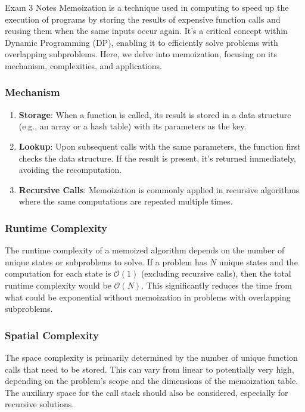 \begin{examnotes}{Exam 3 Notes}
    Memoization is a technique used in computing to speed up the execution of programs by storing the results of expensive function calls and reusing them when the same inputs occur again. It's a 
    critical concept within Dynamic Programming (DP), enabling it to efficiently solve problems with overlapping subproblems. Here, we delve into memoization, focusing on its mechanism, complexities, 
    and applications.

    \subsubsection*{Mechanism}

    \begin{enumerate}
        \item \textbf{Storage}: When a function is called, its result is stored in a data structure (e.g., an array or a hash table) with its parameters as the key.
        \item \textbf{Lookup}: Upon subsequent calls with the same parameters, the function first checks the data structure. If the result is present, it's returned immediately, avoiding the recomputation.
        \item \textbf{Recursive Calls}: Memoization is commonly applied in recursive algorithms where the same computations are repeated multiple times.
    \end{enumerate}

    \subsubsection*{Runtime Complexity}

    The runtime complexity of a memoized algorithm depends on the number of unique states or subproblems to solve. If a problem has $N$ unique states and the computation for each state is $\mathcal{O}(1)$ 
    (excluding recursive calls), then the total runtime complexity would be $\mathcal{O}(N)$. This significantly reduces the time from what could be exponential without memoization in problems with 
    overlapping subproblems.

    \subsubsection*{Spatial Complexity}

    The space complexity is primarily determined by the number of unique function calls that need to be stored. This can vary from linear to potentially very high, depending on the problem's scope and 
    the dimensions of the memoization table. The auxiliary space for the call stack should also be considered, especially for recursive solutions.


\end{examnotes}
